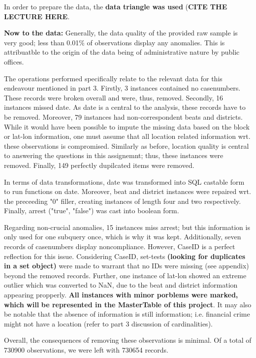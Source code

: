 \documentclass[a4paper]{article}
\begin{document}
In order to prepare the data, the \textbf{data triangle was used} (\textbf{CITE THE LECTURE HERE}. 

\textbf{Now to the data: }Generally, the data quality of the provided  raw sample is very good; less than 0.01\% of observations display any anomalies. This is attribuatble to the origin of the data being of administrative nature by public offices.

\indent The operations performed specifically relate to the relevant data for this endeavour mentioned in part 3. Firstly, 3 instances contained no casenumbers. These records were broken overall and were, thus, removed. Secondly, 16 instances missed date. As date is a central to the analysis, these records have to be removed. Moreover, 79 instances had non-correspondent beats and districts. While it would have been possible to impute the missing data based on the block or lat-lon information, one must assume that all location related information wrt. these observations is compromised. Similarly as before, location quality is central to answering the questions in this assignemnt; thus, these instances were removed. Finally, 149 perfectly dupilcated items were removed. 

\indent In terms of data transformations, date was transformed into SQL castable form to run functions on date. Moreover, beat and district instances were repaired wrt. the preceeding "0" filler, creating instances of length four and two respectively. Finally, arrest ("true", "false") was cast into boolean form. 

\indent Regarding non-crucial anomalies, 15 instances miss arrest; but this information is only used for one subquery once, which is why it was kept. Additionally, seven records of casenumbers display noncompliance. However, CaseID is a perfect reflection for this issue. Considering CaseID, set-tests \textbf{(looking for duplicates in a set object)} were made to warrant that no IDs were missing (see appendix) beyond the removed records. Further, one instance of lat-lon showed an extreme outlier which was converted to NaN, due to the beat and district information appearing propperly.\textbf{ All instances with minor porblems were marked, which will} \textbf{be represented in the MasterTable of this project}. It may also be notable that the absence of information is still information; i.e. financial crime might not have a location (refer to part 3 discussion of cardinalities). 

Overall, the consequences of removing these observations is minimal. Of a total of 730900 observations, we were left with 730654 records. 
\end{document}
